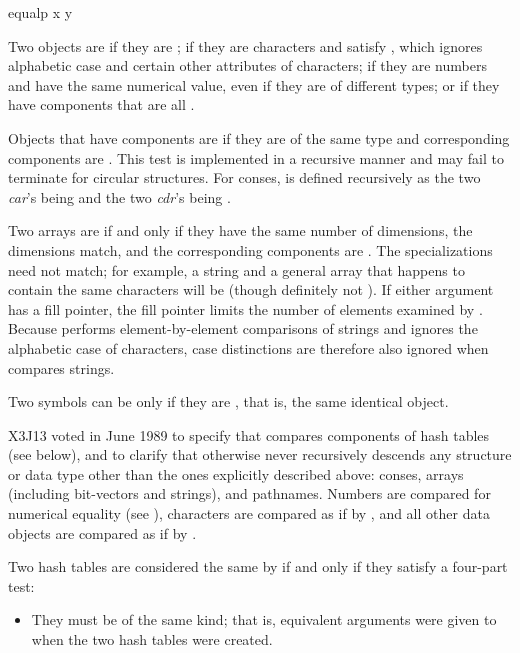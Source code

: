 \begin{defun}[Function]
equalp x y

Two objects are  if they are ;
if they are characters and satisfy ,
which ignores alphabetic case and certain other attributes of characters;
if they are numbers and have the same numerical value,
even if they are of different types;
or if they have components that are all .

Objects that have components are  if they are of the same
type and corresponding components are .
This test is implemented in a recursive manner and may fail to
terminate for circular structures.
For conses,  is defined recursively as
the two \emph{car}'s being  and the two \emph{cdr}'s being
.

Two arrays are  if and only if they have the same
number of dimensions, the dimensions match,
and the corresponding components are .
The specializations need not match; for example,
a string and a general array that happens to contain the same characters
will be  (though definitely not ).
If either argument has a fill pointer, the fill pointer limits
the number of elements examined by .
Because  performs element-by-element comparisons
of strings and ignores the alphabetic case of characters,
case distinctions are therefore also ignored when  compares
strings.

Two symbols can be  only if they are , that is, the same
identical object.

\begin{new}
X3J13 voted in June 1989
to specify that  compares components
of hash tables (see below), and to
clarify that otherwise  never recursively
descends any structure or data type other than the ones explicitly
described above: conses, arrays (including bit-vectors and strings), and pathnames.
Numbers are compared for numerical equality (see \cdf{=}),
characters are compared as if by , and all other
data objects are compared as if by .

Two hash tables are considered the same by  if and only if
they satisfy a four-part test:
\begin{itemize}
\item They must be
of the same kind; that is, equivalent  arguments were given to
 when the two hash tables were created.


\end{itemize}
\end{new}
\end{defun}
